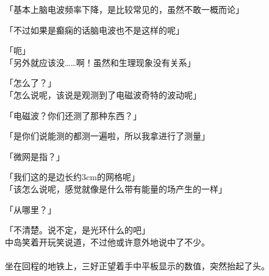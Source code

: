 「基本上脑电波频率下降，是比较常见的，虽然不敢一概而论」

「不过如果是癫痫的话脑电波也不是这样的呢」

「呃」\\

「另外就应该没……啊！虽然和生理现象没有关系」

「怎么了？」\\

「怎么说呢，该说是观测到了电磁波奇特的波动呢」

「电磁波？你们还测了那种东西？」

「是你们说能测的都测一遍啦，所以我拿进行了测量」

「微网是指？」

「我们这的是边长约3cm的网格呢」\\

「该怎么说呢，感觉就像是什么带有能量的场产生的一样」

「从哪里？」

「不清楚。说不定，是光环什么的吧」\\

中岛笑着开玩笑说道，不过他或许意外地说中了不少。\\

\sqsplit\\

坐在回程的地铁上，三好正望着手中平板显示的数值，突然抬起了头。\\

